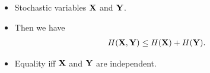 %
%

\begin{frame}
  \begin{lemma}
    \begin{itemize}
      \item Stochastic variables \(\mathbf X\) and \(\mathbf Y\).
      \item Then we have
        \begin{align*}
          H(\mathbf X, \mathbf Y)\leq H(\mathbf X) + H(\mathbf Y).
        \end{align*}
      \item Equality iff \(\mathbf X\) and \(\mathbf Y\) are independent.
    \end{itemize}
  \end{lemma}
\end{frame}

%
%

